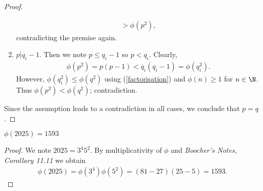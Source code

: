 \documentclass{article}
\begin{document}
\begin{claim*}[1]
\begin{proof}
\begin{enumerate}
\begin{align*}
                  >    \phi\left(p^2\right) ,
               \end{align*}
               contradicting the premise again.
         \item $p|q_i-1$. Then we note $p\leq q_i-1$ so $p<q_i$.  Clearly,
               \begin{align*}
                  \phi\left(p^2\right)=p(p-1)<q_i(q_i-1)=\phi\left(q_i^2\right).
               \end{align*}
               However, $\phi\left(q_i^2\right)\leq \phi\left(q^2\right)$ using
               (\ref{factorisation}) and $\phi(n)\geq 1$ for $n\in\N$. Thus
               $\phi\left(p^2\right)<\phi\left(q^2\right)$; contradiction.
      \end{enumerate}
      Since the assumption leads to a contradiction in all cases, we conclude
      that $p=q$.
   \end{proof}
\end{claim*}

\begin{claim*}[2]
   $\phi(2025)=1593$
   \begin{proof}
      We note $2025 = 3^4 5^2$.
      By multiplicativity of $\phi$ and \emph{Boocher's Notes, Corollary 11.11}
      we obtain
      \begin{align*}
         \phi(2025) = \phi(3^4)\phi(5^2) = (81-27)(25-5) = 1593.
      \end{align*}
   \end{proof}
\end{claim*}
\end{document}
